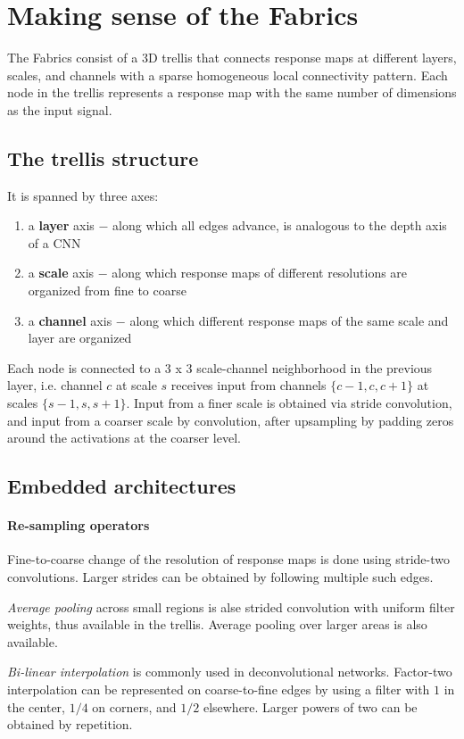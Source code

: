\documentclass[a4paper,twocolumn]{article}
\begin{document}
\section{Making sense of the Fabrics}
The Fabrics consist of a 3D trellis that connects response maps at different layers, scales, and channels with a sparse homogeneous local connectivity pattern.
Each node in the trellis represents a response map with the same number of dimensions as the input signal.

\subsection{The trellis structure}
It is spanned by three axes:
\begin{enumerate}
    \item a \textbf{layer} axis $-$ along which all edges advance, is analogous to the depth axis of a CNN
    \item a \textbf{scale} axis $-$ along which response maps of different resolutions are organized from fine to coarse
    \item a \textbf{channel} axis $-$ along which different response maps of the same scale and layer are organized
\end{enumerate}

Each node is connected to a 3 x 3 scale-channel neighborhood in the previous layer, i.e. channel $c$ at scale $s$ receives input from channels $\{c-1, c, c+1\}$ at scales $\{s-1, s, s+1\}$. Input from a finer scale is obtained via stride convolution, and input from a coarser scale by convolution, after upsampling by padding zeros around the activations at the coarser level.

\subsection{Embedded architectures}
\paragraph{Re-sampling operators}
Fine-to-coarse change of the resolution of response maps is done using stride-two convolutions. Larger strides can be obtained by following multiple such edges.

\textit{Average pooling} across small regions is alse strided convolution with uniform filter weights, thus available in the trellis. Average pooling over larger areas is also available.

\textit{Bi-linear interpolation} is commonly used in deconvolutional networks. Factor-two interpolation can be represented on coarse-to-fine edges by using a filter with $1$ in the center, $1/4$ on corners, and $1/2$ elsewhere. Larger powers of two can be obtained by repetition.
\end{document}

